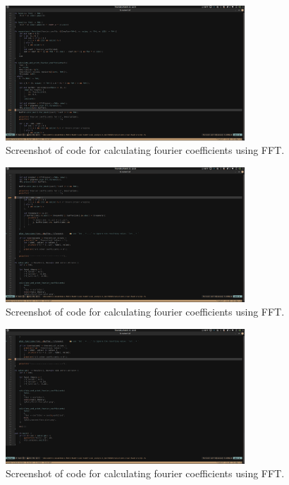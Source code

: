 \documentclass[12pt, letterpaper]{article}
\theoremstyle{nonumberplain}
\begin{document}
\begin{figure}[!htbp]
	\centering
	\includegraphics[width=0.8\textwidth]{numhw3-q5-code-1.png}
	\caption{Screenshot of code for calculating fourier coefficients using FFT.}
\end{figure}
\begin{figure}[!htbp]
	\centering
	\includegraphics[width=0.8\textwidth]{numhw3-q5-code-2.png}
	\caption{Screenshot of code for calculating fourier coefficients using FFT.}
\end{figure}
\begin{figure}[!htbp]
	\centering
	\includegraphics[width=0.8\textwidth]{numhw3-q5-code-3.png}
	\caption{Screenshot of code for calculating fourier coefficients using FFT.}
\end{figure}
\end{document}

